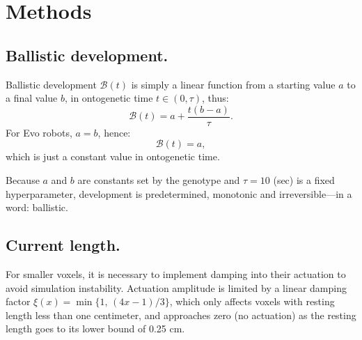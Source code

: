 
\section{Methods}
\label{sec4:methods}


\subsection*{Ballistic development.}

Ballistic development 
$\mathcal{B}(t)$
is simply a linear function from a starting value $a$ to a final value $b$, in ontogenetic time $t\in(0,\tau)$, thus: 
\begin{equation}
\label{eq4:ballistic-devo}
\mathcal{B}(t) = a + \frac{t(b-a)}{\tau}.
\end{equation}
For Evo robots, $a=b$, hence:
\begin{equation}
\label{eq4:no-devo}
\mathcal{B}(t) = a,
\end{equation}
which is just a constant value in ontogenetic time.

Because $a$ and $b$ are constants set by the genotype and $\tau=10$ (sec) is a fixed hyperparameter, development is predetermined, monotonic and irreversible---in a word: ballistic.



\subsection*{Current length.} 

For smaller voxels, it is necessary to implement damping into their actuation to avoid simulation instability. 
Actuation amplitude is limited by a linear damping factor $\xi(x) = \min\{1,\, (4x-1)/3\}$, which only affects voxels with resting length less than one centimeter, and approaches zero (no actuation) as the resting length goes to its lower bound of 0.25 cm.

